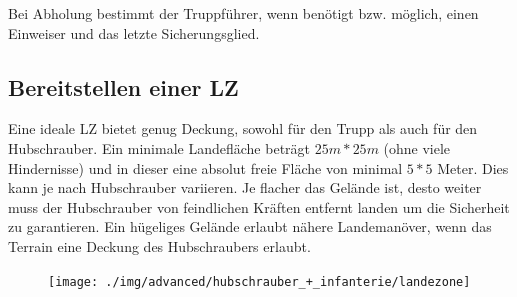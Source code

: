 	Bei Abholung bestimmt der Truppführer, wenn benötigt bzw. möglich, einen Einweiser und das letzte Sicherungsglied.

\subsection{Bereitstellen einer \acf{LZ}}
	Eine ideale \ac{LZ} bietet genug Deckung, sowohl für den Trupp als auch für den Hubschrauber. Ein minimale Landefläche beträgt $25m * 25m$ (ohne viele Hindernisse) und in dieser eine absolut freie Fläche von minimal $5 * 5$ Meter. Dies kann je nach Hubschrauber variieren. Je flacher das Gelände ist, desto weiter muss der Hubschrauber von feindlichen Kräften entfernt landen um die Sicherheit zu garantieren. Ein hügeliges Gelände erlaubt nähere Landemanöver, wenn das Terrain eine Deckung des Hubschraubers erlaubt.
	\begin{figure}[htbp]
		\centering
		\texttt{[image: ./img/advanced/hubschrauber\_+\_infanterie/landezone]}
	\end{figure}	

